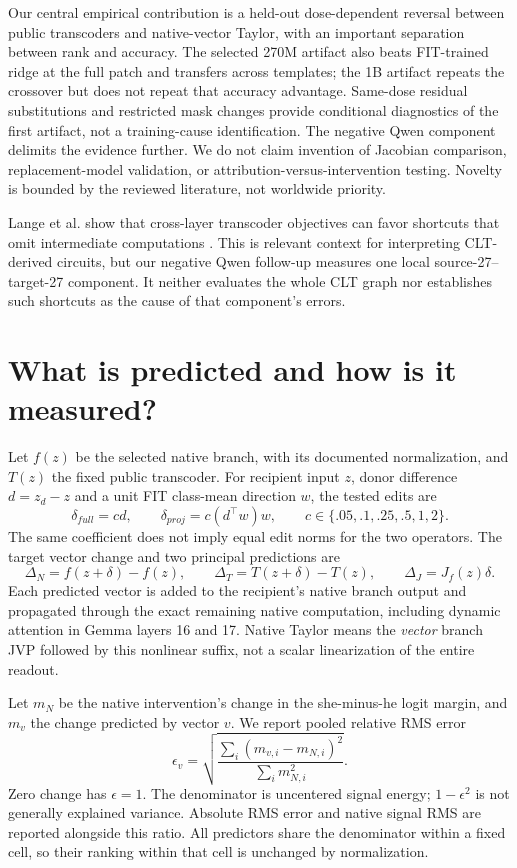 Our central empirical contribution is a held-out dose-dependent reversal between public transcoders and native-vector Taylor, with an important separation between rank and accuracy. The selected 270M artifact also beats FIT-trained ridge at the full patch and transfers across templates; the 1B artifact repeats the crossover but does not repeat that accuracy advantage. Same-dose residual substitutions and restricted mask changes provide conditional diagnostics of the first artifact, not a training-cause identification. The negative Qwen component delimits the evidence further. We do not claim invention of Jacobian comparison, replacement-model validation, or attribution-versus-intervention testing. Novelty is bounded by the reviewed literature, not worldwide priority.

Lange et al. show that cross-layer transcoder objectives can favor shortcuts that omit intermediate computations \citep{lange2026}. This is relevant context for interpreting CLT-derived circuits, but our negative Qwen follow-up measures one local source-27--target-27 component. It neither evaluates the whole CLT graph nor establishes such shortcuts as the cause of that component's errors.

\section{What is predicted and how is it measured?}
Let $f(z)$ be the selected native branch, with its documented normalization, and $T(z)$ the fixed public transcoder. For recipient input $z$, donor difference $d=z_d-z$ and a unit FIT class-mean direction $w$, the tested edits are
\[
 \delta_{full}=cd,\qquad \delta_{proj}=c(d^\top w)w,
 \qquad c\in\{.05,.1,.25,.5,1,2\}.
\]
The same coefficient does not imply equal edit norms for the two operators. The target vector change and two principal predictions are
\[
 \Delta_N=f(z+\delta)-f(z),\qquad
 \Delta_T=T(z+\delta)-T(z),\qquad
 \Delta_J=J_f(z)\delta.
\]
Each predicted vector is added to the recipient's native branch output and propagated through the exact remaining native computation, including dynamic attention in Gemma layers 16 and 17. Native Taylor means the \emph{vector} branch JVP followed by this nonlinear suffix, not a scalar linearization of the entire readout.

Let $m_N$ be the native intervention's change in the she-minus-he logit margin, and $m_v$ the change predicted by vector $v$. We report pooled relative RMS error
\[
 \epsilon_v=\sqrt{\frac{\sum_i(m_{v,i}-m_{N,i})^2}{\sum_i m_{N,i}^2}}.
\]
Zero change has $\epsilon=1$. The denominator is uncentered signal energy; $1-\epsilon^2$ is not generally explained variance. Absolute RMS error and native signal RMS are reported alongside this ratio. All predictors share the denominator within a fixed cell, so their ranking within that cell is unchanged by normalization.

